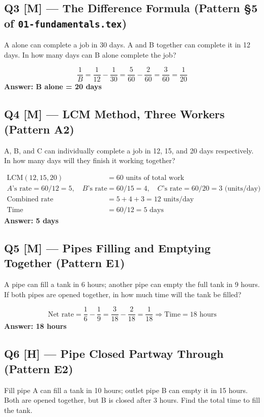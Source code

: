 \documentclass[11pt]{article}
\begin{document}
\subsection*{Q3 [M] --- The Difference Formula (Pattern \S5 of \texttt{01-fundamentals.tex})}
A alone can complete a job in 30 days. A and B together can complete it in 12 days. In how many days
can B alone complete the job?

\begin{tipbox}[Solution]
\[
\frac{1}{B} = \frac{1}{12} - \frac{1}{30} = \frac{5}{60} - \frac{2}{60} = \frac{3}{60} = \frac{1}{20}
\]
\textbf{Answer: B alone = 20 days}
\end{tipbox}

\subsection*{Q4 [M] --- LCM Method, Three Workers (Pattern A2)}
A, B, and C can individually complete a job in 12, 15, and 20 days respectively. In how many days
will they finish it working together?

\begin{tipbox}[Solution]
\begin{align*}
\text{LCM}(12,15,20) &= 60 \text{ units of total work} \\
A\text{'s rate} = 60/12 = 5,\quad B\text{'s rate} &= 60/15 = 4,\quad C\text{'s rate} = 60/20 = 3
\text{ (units/day)} \\
\text{Combined rate} &= 5+4+3 = 12 \text{ units/day} \\
\text{Time} &= 60/12 = 5 \text{ days}
\end{align*}
\textbf{Answer: 5 days}
\end{tipbox}

\subsection*{Q5 [M] --- Pipes Filling and Emptying Together (Pattern E1)}
A pipe can fill a tank in 6 hours; another pipe can empty the full tank in 9 hours. If both pipes are
opened together, in how much time will the tank be filled?

\begin{tipbox}[Solution]
\[
\text{Net rate} = \frac{1}{6} - \frac{1}{9} = \frac{3}{18} - \frac{2}{18} = \frac{1}{18}
\Rightarrow \text{Time} = 18 \text{ hours}
\]
\textbf{Answer: 18 hours}
\end{tipbox}

\subsection*{Q6 [H] --- Pipe Closed Partway Through (Pattern E2)}
Fill pipe A can fill a tank in 10 hours; outlet pipe B can empty it in 15 hours. Both are opened
together, but B is closed after 3 hours. Find the total time to fill the tank.
\end{document}
